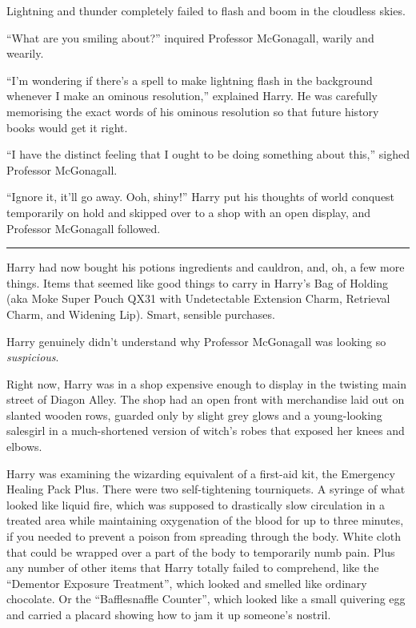 Lightning and thunder completely failed to flash and boom in the
cloudless skies.

``What are you smiling about?'' inquired Professor McGonagall, warily
and wearily.

``I'm wondering if there's a spell to make lightning flash in the
background whenever I make an ominous resolution,'' explained Harry. He
was carefully memorising the exact words of his ominous resolution so
that future history books would get it right.

``I have the distinct feeling that I ought to be doing something about
this,'' sighed Professor McGonagall.

``Ignore it, it'll go away. Ooh, shiny!'' Harry put his thoughts of
world conquest temporarily on hold and skipped over to a shop with an
open display, and Professor McGonagall followed.

\begin{center}\rule{3in}{0.4pt}\end{center}

Harry had now bought his potions ingredients and cauldron, and, oh, a
few more things. Items that seemed like good things to carry in Harry's
Bag of Holding (aka Moke Super Pouch QX31 with Undetectable Extension
Charm, Retrieval Charm, and Widening Lip). Smart, sensible purchases.

Harry genuinely didn't understand why Professor McGonagall was looking
so \emph{suspicious}.

Right now, Harry was in a shop expensive enough to display in the
twisting main street of Diagon Alley. The shop had an open front with
merchandise laid out on slanted wooden rows, guarded only by slight grey
glows and a young-looking salesgirl in a much-shortened version of
witch's robes that exposed her knees and elbows.

Harry was examining the wizarding equivalent of a first-aid kit, the
Emergency Healing Pack Plus. There were two self-tightening tourniquets.
A syringe of what looked like liquid fire, which was supposed to
drastically slow circulation in a treated area while maintaining
oxygenation of the blood for up to three minutes, if you needed to
prevent a poison from spreading through the body. White cloth that could
be wrapped over a part of the body to temporarily numb pain. Plus any
number of other items that Harry totally failed to comprehend, like the
``Dementor Exposure Treatment'', which looked and smelled like ordinary
chocolate. Or the ``Bafflesnaffle Counter'', which looked like a small
quivering egg and carried a placard showing how to jam it up someone's
nostril.

